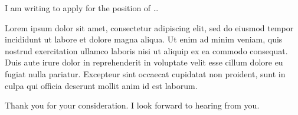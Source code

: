 \documentclass[10pt,stdletter]{newlfm}
\begin{document}
\begin{newlfm}

I am writing to apply for the position of \ldots{}

Lorem ipsum dolor sit amet, consectetur adipiscing elit, sed do eiusmod tempor incididunt ut labore et dolore magna aliqua. Ut enim ad minim veniam, quis nostrud exercitation ullamco laboris nisi ut aliquip ex ea commodo consequat. Duis aute irure dolor in reprehenderit in voluptate velit esse cillum dolore eu fugiat nulla pariatur. Excepteur sint occaecat cupidatat non proident, sunt in culpa qui officia deserunt mollit anim id est laborum.

Thank you for your consideration.  I look forward to
hearing from you.

\end{newlfm}
\end{document}
